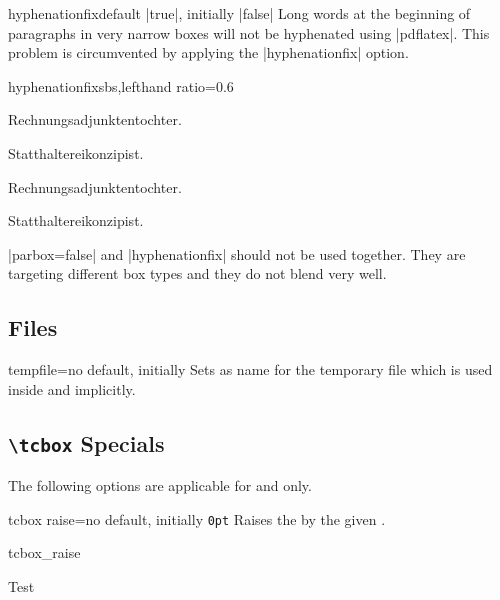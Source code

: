 \clearpage
\begin{docTcbKey}{hyphenationfix}{}{default |true|, initially |false|}
  Long words at the beginning of paragraphs in very narrow boxes
  will not be hyphenated using |pdflatex|. This problem is circumvented by
  applying the |hyphenationfix| option.

\begin{exdispExample*}{hyphenationfix}{sbs,lefthand ratio=0.6}

\begin{tcolorbox}
Rechnungsadjunktentochter.\par
Statthaltereikonzipist.
\end{tcolorbox}

\begin{tcolorbox}[hyphenationfix]
Rechnungsadjunktentochter.\par
Statthaltereikonzipist.
\end{tcolorbox}
\end{exdispExample*}

\smallskip
\begin{marker}
|parbox=false| and |hyphenationfix| should not be used together. They are
targeting different box types and they do not blend very well.
\end{marker}
\end{docTcbKey}


\subsection{Files}
\begin{docTcbKey}{tempfile}{=}{no default, initially }
  Sets  as name for the temporary file which is used inside
   and  implicitly.
\end{docTcbKey}

\clearpage
\subsection{\texttt{\textbackslash tcbox} Specials}
The following options are applicable for  and 
only.

\begin{docTcbKey}{tcbox raise}{=}{no default, initially \texttt{0pt}}
  Raises the  by the given .
\begin{exdispExample}{tcbox_raise}

Test\dotfill
{}\dotfill
{}\dotfill
{}
\end{exdispExample}
\end{docTcbKey}

